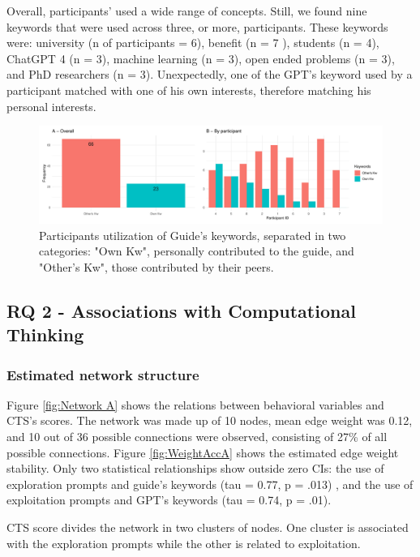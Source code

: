 \documentclass[sn-mathphys, Numbered]{sn-jnl}%
\theoremstyle{thmstyleone}%
\theoremstyle{thmstyletwo}%
\theoremstyle{thmstylethree}%
\begin{document}
Overall, participants' used a wide range of concepts. Still, we found nine keywords that were used across three, or more, participants. These keywords were: university (n of participants = 6), benefit (n = 7 ), students (n = 4), ChatGPT 4 (n = 3), machine learning (n = 3), open ended problems (n = 3), and PhD researchers (n = 3). Unexpectedly, one of the GPT's keyword used by a participant matched with one of his own interests, therefore matching his personal interests.
\begin{figure}[H]
    \centering
    \includegraphics[width=1\linewidth]{KWofinterest.pdf}
    \caption{Participants utilization of Guide's keywords, separated in two categories: "Own Kw", personally contributed to the guide, and "Other's Kw", those contributed by their peers.}
    \label{fig:KW of interest}
\end{figure}


\subsection*{RQ 2 - Associations with Computational Thinking}

\subsubsection*{Estimated network structure}


Figure \ref{fig:Network A}  shows the relations between behavioral variables and CTS's scores.  The network was made up of 10 nodes, mean edge weight was 0.12, and 10 out of 36 possible connections were observed, consisting of 27\% of all possible connections. Figure \ref{fig:WeightAccA} shows the estimated edge weight stability. Only two statistical relationships show outside zero CIs: the use of exploration prompts and guide's keywords (tau = 0.77, p = .013) , and the use of exploitation prompts and GPT's keywords (tau = 0.74, p = .01).

CTS score divides the network in two clusters of nodes. One cluster is associated with the exploration prompts while the other is related to exploitation. 
\end{document}
